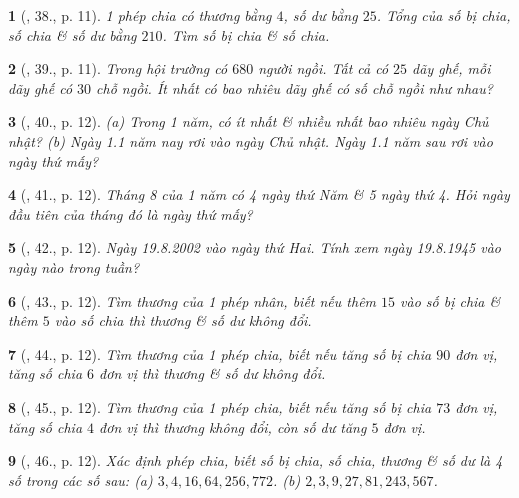\documentclass{article}
\newtheorem{baitoan}{}
\begin{document}
\begin{baitoan}[\cite{Binh_Toan_6_tap_1}, 38., p. 11]
	1 phép chia có thương bằng $4$, số dư bằng $25$. Tổng của số bị chia, số chia \& số dư bằng $210$. Tìm số bị chia \& số chia.
\end{baitoan}

\begin{baitoan}[\cite{Binh_Toan_6_tap_1}, 39., p. 11]
	Trong hội trường có $680$ người ngồi. Tất cả có $25$ dãy ghế, mỗi dãy ghế có $30$ chỗ ngồi. Ít nhất có bao nhiêu dãy ghế có số chỗ ngồi như nhau?
\end{baitoan}

\begin{baitoan}[\cite{Binh_Toan_6_tap_1}, 40., p. 12]
	(a) Trong 1 năm, có ít nhất \& nhiều nhất bao nhiêu ngày Chủ nhật? (b) Ngày 1.1 năm nay rơi vào ngày Chủ nhật. Ngày 1.1 năm sau rơi vào ngày thứ mấy?
\end{baitoan}

\begin{baitoan}[\cite{Binh_Toan_6_tap_1}, 41., p. 12]
	Tháng 8 của 1 năm có 4 ngày thứ Năm \& 5 ngày thứ 4. Hỏi ngày đầu tiên của tháng đó là ngày thứ mấy?
\end{baitoan}

\begin{baitoan}[\cite{Binh_Toan_6_tap_1}, 42., p. 12]
	Ngày 19.8.2002 vào ngày thứ Hai. Tính xem ngày 19.8.1945 vào ngày nào trong tuần?
\end{baitoan}

\begin{baitoan}[\cite{Binh_Toan_6_tap_1}, 43., p. 12]
	Tìm thương của 1 phép nhân, biết nếu thêm $15$ vào số bị chia \& thêm $5$ vào số chia thì thương \& số dư không đổi.
\end{baitoan}

\begin{baitoan}[\cite{Binh_Toan_6_tap_1}, 44., p. 12]
	Tìm thương của 1 phép chia, biết nếu tăng số bị chia $90$ đơn vị, tăng số chia $6$ đơn vị thì thương \& số dư không đổi.
\end{baitoan}

\begin{baitoan}[\cite{Binh_Toan_6_tap_1}, 45., p. 12]
	Tìm thương của 1 phép chia, biết nếu tăng số bị chia $73$ đơn vị, tăng số chia $4$ đơn vị thì thương không đổi, còn số dư tăng $5$ đơn vị.
\end{baitoan}

\begin{baitoan}[\cite{Binh_Toan_6_tap_1}, 46., p. 12]
	Xác định phép chia, biết số bị chia, số chia, thương \& số dư là 4 số trong các số sau: (a) $3,4,16,64,256,772$. (b) $2,3,9,27,81,243,567$.
\end{baitoan}
\end{document}
